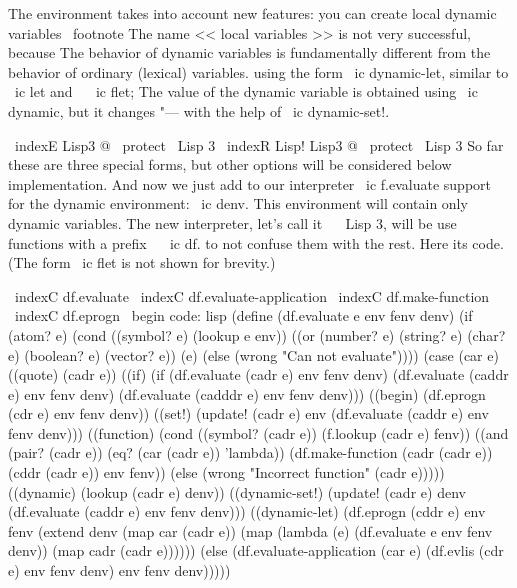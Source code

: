 The environment takes into account new features: you can create local dynamic
variables \ footnote {The name << local variables >> is not very successful, because
The behavior of dynamic variables is fundamentally different from the behavior of ordinary
(lexical) variables.} using the form \ ic {dynamic-let}, similar to \ ic {let}
and ~ \ ic {flet}; The value of the dynamic variable is obtained using \ ic {dynamic},
but it changes "--- with the help of \ ic {dynamic-set!}.

\ indexE {Lisp3 @ \ protect \ Lisp 3}
\ indexR {Lisp! Lisp3 @ \ protect \ Lisp 3}
So far these are three special forms, but other options will be considered below
implementation. And now we just add to our interpreter \ ic {f.evaluate}
support for the dynamic environment: \ ic {denv}. This environment will contain
only dynamic variables. The new interpreter, let's call it ~ \ Lisp 3, will be
use functions with a prefix ~ \ ic {df.} to not confuse them with the rest. Here
its code. (The form \ ic {flet} is not shown for brevity.)

\ indexC {df.evaluate}
\ indexC {df.evaluate-application}
\ indexC {df.make-function}
\ indexC {df.eprogn}
\ begin {code: lisp}
(define (df.evaluate e env fenv denv)
  (if (atom? e)
      (cond ((symbol? e) (lookup e env))
            ((or (number? e) (string? e) (char? e)
                 (boolean? e) (vector? e))
             (e)
            (else (wrong "Can not evaluate"))))
      (case (car e)
        ((quote) (cadr e))
        ((if) (if (df.evaluate (cadr e) env fenv denv)
                      (df.evaluate (caddr e) env fenv denv)
                      (df.evaluate (cadddr e) env fenv denv)))
        ((begin) (df.eprogn (cdr e) env fenv denv))
        ((set!) (update! (cadr e)
                           env
                           (df.evaluate (caddr e) env fenv denv)))
        ((function)
         (cond ((symbol? (cadr e))
                (f.lookup (cadr e) fenv))
               ((and (pair? (cadr e)) (eq? (car (cadr e)) 'lambda))
                (df.make-function
                 (cadr (cadr e)) (cddr (cadr e)) env fenv))
               (else (wrong "Incorrect function" (cadr e)))))
        ((dynamic) (lookup (cadr e) denv))
        ((dynamic-set!)
         (update! (cadr e)
                  denv
                  (df.evaluate (caddr e) env fenv denv)))
        ((dynamic-let)
         (df.eprogn (cddr e)
                    env
                    fenv
                    (extend denv
                            (map car (cadr e))
                            (map (lambda (e)
                                   (df.evaluate e env fenv denv))
                                 (map cadr (cadr e))))))
        (else (df.evaluate-application (car e)
                                       (df.evlis (cdr e) env fenv denv)
                                       env
                                       fenv
                                       denv)))))

